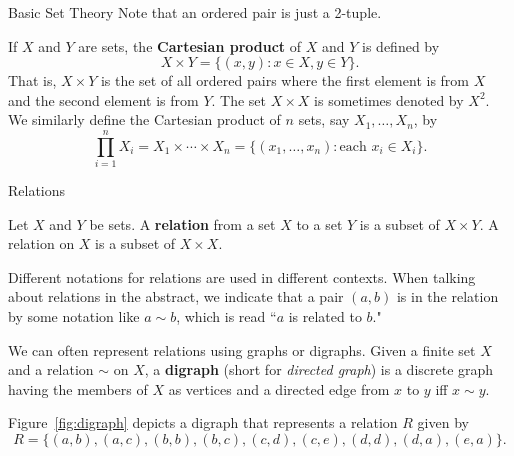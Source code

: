 \begin{section}{Basic Set Theory}
Note that an ordered pair is just a 2-tuple.

\begin{definition}
If $X$ and $Y$ are sets, the \textbf{Cartesian product} of $X$ and $Y$ is defined by
\[
X\times Y=\{(x,y): x\in X, y\in Y\}.
\]
That is, $X\times Y$ is the set of all ordered pairs where the first element is from $X$ and the second element is from $Y$.  The set $X\times X$ is sometimes denoted by $X^2$.  We similarly define the Cartesian product of $n$ sets, say $X_1, \ldots, X_n$, by
\[
\prod_{i=1}^{n} X_i=X_1\times \cdots \times X_n=\{(x_1,\ldots,x_n): \mbox{each } x_i\in X_i\}.
\]
\end{definition}

\end{section}

\begin{section}{Relations}

\begin{definition}
Let $X$ and $Y$ be sets. A \textbf{relation} from a set $X$ to a set $Y$ is a subset of $X \times Y$. A relation on $X$ is a subset of $X \times X$.  
\end{definition}

\begin{remark}
Different notations for relations are used in different contexts.  When talking about relations in the abstract, we indicate that a pair $(a,b)$ is in the relation by some notation like $a\sim b$, which is read ``$a$ is related to $b$."
\end{remark}

\begin{remark}
We can often represent relations using graphs or digraphs.  Given a finite set $X$ and a relation $\sim$ on $X$, a \textbf{digraph} (short for \emph{directed graph}) is a discrete graph having the members of $X$ as vertices and a directed edge from $x$ to $y$ iff $x\sim y$.
\end{remark}

\begin{example}
Figure~\ref{fig:digraph} depicts a digraph that represents a relation $R$ given by
\[
R=\{(a,b),(a,c),(b,b),(b,c),(c,d),(c,e),(d,d),(d,a),(e,a)\}.
\]

\begin{figure}[h]
\begin{center}
\end{center}
\end{figure}
\end{example}
\end{section}
